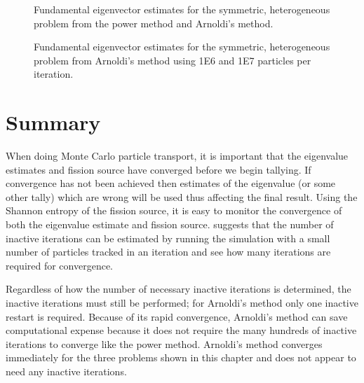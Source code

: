 \begin{figure} \centering
    
    \caption{Fundamental eigenvector estimates for the symmetric, heterogeneous problem from the power method and Arnoldi's method.}
    \label{fig:SymmetricVectors}
\end{figure}

\begin{figure} \centering
    
    \caption{Fundamental eigenvector estimates for the symmetric, heterogeneous problem from Arnoldi's method using 1E6 and 1E7 particles per iteration.}
    \label{fig:SymmetricVector1E7}
\end{figure}

\section{Summary}
When doing Monte Carlo particle transport, it is important that the eigenvalue estimates and fission source have converged before we begin tallying.  If convergence has not been achieved then estimates of the eigenvalue (or some other tally) which are wrong will be used thus affecting the final result.  Using the Shannon entropy of the fission source, it is easy to monitor the convergence of both the eigenvalue estimate and fission source.  \citet{Brown:2009A-Rev-0} suggests that the number of inactive iterations can be estimated by running the simulation with a small number of particles tracked in an iteration and see how many iterations are required for convergence.

Regardless of how the number of necessary inactive iterations is determined, the inactive iterations must still be performed; for Arnoldi's method only one inactive restart is required.  Because of its rapid convergence, Arnoldi's method can save computational expense because it does not require the many hundreds of inactive iterations to converge like the power method.    Arnoldi's method converges immediately for the three problems shown in this chapter and does not appear to need any inactive iterations.


